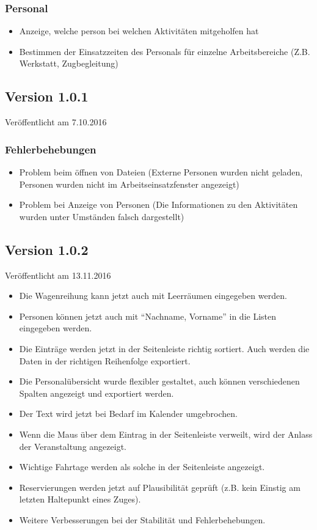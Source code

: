\subsubsection{Personal}
\begin{itemize}
  \item
  Anzeige, welche person bei welchen Aktivitäten mitgeholfen hat
  \item
  Bestimmen der Einsatzzeiten des Personals für einzelne Arbeitsbereiche (Z.B. Werkstatt, Zugbegleitung)
\end{itemize}


\subsection{Version 1.0.1}
\label{version:1:0:1}
Veröffentlicht am 7.10.2016
\subsubsection{Fehlerbehebungen}
\begin{itemize}
  \item Problem beim öffnen von Dateien (Externe Personen wurden nicht geladen, Personen wurden nicht im Arbeitseinsatzfenster angezeigt)
  \item Problem bei Anzeige von Personen (Die Informationen zu den Aktivitäten wurden unter Umständen falsch dargestellt)
\end{itemize}


\subsection{Version 1.0.2}
\label{version:1:0:2}
Veröffentlicht am 13.11.2016
\begin{itemize}
  \item
  Die Wagenreihung kann jetzt auch mit Leerräumen eingegeben werden.
  \item
  Personen können jetzt auch mit "`Nachname, Vorname"' in die Listen eingegeben werden.
  \item
  Die Einträge werden jetzt in der Seitenleiste richtig sortiert. Auch werden die Daten in der richtigen Reihenfolge exportiert.
  \item
  Die Personalübersicht wurde flexibler gestaltet, auch können verschiedenen Spalten angezeigt und exportiert werden.
  \item
  Der Text wird jetzt bei Bedarf im Kalender umgebrochen.
  \item
  Wenn die Maus über dem Eintrag in der Seitenleiste verweilt, wird der Anlass der Veranstaltung angezeigt.
  \item
  Wichtige Fahrtage werden als solche in der Seitenleiste angezeigt.
  \item
  Reservierungen werden jetzt auf Plausibilität geprüft (z.B. kein Einstig am letzten Haltepunkt eines Zuges).
  \item
  Weitere Verbesserungen bei der Stabilität und Fehlerbehebungen.
\end{itemize}



